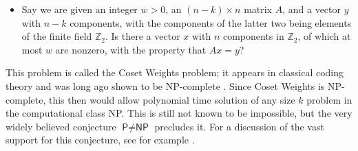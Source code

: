 \documentclass[12pt]{article}
\newcommand{\textcs}[1]{\textsf{#1}}
\newcommand{\NP}{\textcs{NP}}
\begin{document}
\begin{itemize}
\item Say we are given an integer $w>0$, an $(n-k)\times n$ matrix $A$, and a vector $y$ with $n-k$ components, with the components of the latter two being elements of the finite field $\mathbb{Z}_2$. Is there a vector $x$ with $n$ components in $\mathbb{Z}_2$, of which at most $w$ are nonzero, with the property that $Ax=y$?
\end{itemize}
This problem is called the \textcs{Coset Weights} problem; it appears in classical coding theory and was long ago shown to be \NP-complete \cite{berlekamp1978inherent}.  Since \textcs{Coset Weights} is \NP-complete, this then would allow polynomial time solution of any size $k$ problem in the computational class \NP.  This is still not known to be impossible, but the very widely believed conjecture $\textcs{P} \neq \NP$ precludes it.  For a discussion of the vast support for this conjecture, see for example \cite{moore2011nature}.  
\end{document}
